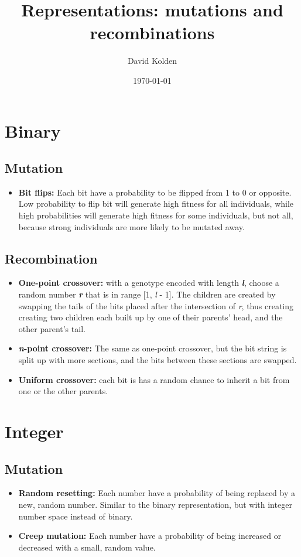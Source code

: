 \documentclass{article}
\date{\today}
\author{David Kolden}
\title{Representations: mutations and recombinations}
\begin{document}
   \maketitle
   \tableofcontents
   \section{Binary}
   \subsection{Mutation}
   \begin{itemize}
   \item \textbf{Bit flips:} Each bit have a probability to be flipped from 1 to 0 or opposite. Low probability to flip bit will generate high fitness for all individuals, while high probabilities will generate high fitness for some individuals, but not all, because strong individuals are more likely to be mutated away.
   \end{itemize}
   \subsection{Recombination}
   \begin{itemize}
   \item \textbf{One-point crossover:} with a genotype encoded with length \textbf{\emph{l}}, choose a random number \textbf{\emph{r}} that is in range [1, \emph{l} - 1]. The children are created by swapping the tails of the bits placed after the intersection of \emph{r}, thus creating creating two children each built up by one of their parents' head, and the other parent's tail.
   \item \textbf{\textit{n}-point crossover:} The same as one-point crossover, but the bit string is split up with more sections, and the bits between these sections are swapped.
   \item \textbf{Uniform crossover:} each bit is has a random chance to inherit a bit from one or the other parents.
   \end{itemize}
   \section{Integer}
   \subsection{Mutation}
   \begin{itemize}
   \item \textbf{Random resetting:} Each number have a probability of being replaced by a new, random number. Similar to the binary representation, but with integer number space instead of binary.
   \item \textbf{Creep mutation:} Each number have a probability of being increased or decreased with a small, random value. 
   \end{itemize}
\end{document}
